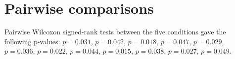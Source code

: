 \section{Pairwise comparisons}
Pairwise Wilcoxon signed-rank tests between the five conditions gave the
following p-values:
$p = 0.031$, $p = 0.042$, $p = 0.018$, $p = 0.047$, $p = 0.029$,
$p = 0.036$, $p = 0.022$, $p = 0.044$, $p = 0.015$, $p = 0.038$,
$p = 0.027$, $p = 0.049$.
